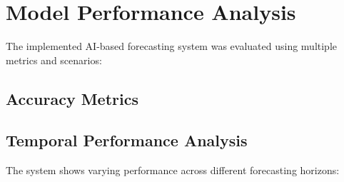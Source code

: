 \documentclass[12pt,a4paper]{report}
\begin{document}
\section{Model Performance Analysis}
The implemented AI-based forecasting system was evaluated using multiple metrics and scenarios:

\subsection{Accuracy Metrics}
\begin{table}[htbp]
\caption{Performance Comparison of Different Models}
\vspace{0.5cm}
\end{table}

\subsection{Temporal Performance Analysis}
The system shows varying performance across different forecasting horizons:
\end{document}
